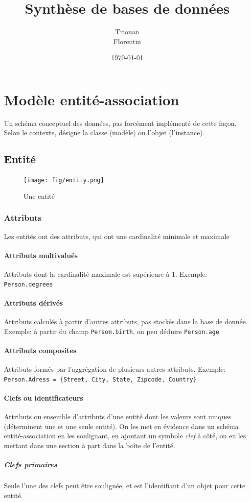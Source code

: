 \documentclass[a4paper]{article}
\author{Titouan \bsc{Christophe}\\Florentin \bsc{Hennecker}}
\title{Synthèse de bases de données}
\date{\today}
\begin{document}
\maketitle
\tableofcontents

\section{Modèle entité-association}
Un schéma conceptuel des données, pas forcément implémenté de cette façon.
Selon le contexte, désigne la classe (modèle) ou l'objet (l'instance).

\subsection{Entité}
\begin{figure}[H]
    \center
    \texttt{[image: fig/entity.png]}
    \caption{Une entité}
\end{figure}

\subsubsection{Attributs}
Les entités ont des attributs, qui ont une cardinalité minimale et maximale

\paragraph{Attributs multivalués}
Attributs dont la cardinalité maximale est supérieure à 1.
Exemple: \texttt{Person.degrees}

\paragraph{Attributs dérivés}
Attributs calculés à partir d'autres attributs, pas stockés dans la base de donnée.
Exemple: à partir du champ \texttt{Person.birth}, on peu déduire \texttt{Person.age}

\paragraph{Attributs composites}
Attributs formés par l'aggrégation de plusieurs autres attributs.
Exemple: \texttt{Person.Adress = \{Street, City, State, Zipcode, Country\}}

\paragraph{Clefs ou identificateurs}
Attributs ou ensemble d'attributs d'une entité dont les valeurs sont uniques
(déterminent une et une seule entité). On les met en évidence dans un schéma
entité-association en les soulignant, en ajoutant un symbole \textit{clef} à côté,
ou en les mettant dans une section à part dans la boîte de l'entité.
\subparagraph{Clefs primaires}
Seule l'une des clefs peut être soulignée, et est l'identifiant d'un objet pour
cette entité.
\end{document}
